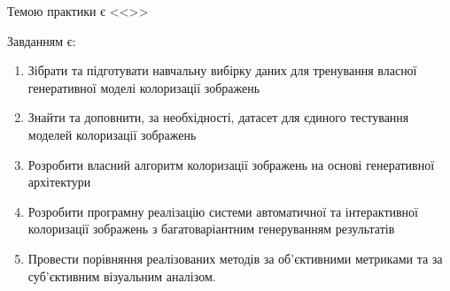 Темою практики є <<\reportTitle>>

Завданням є:
\begin{enumerate}
    \item Зібрати та підготувати навчальну вибірку даних для тренування власної генеративної моделі колоризації зображень
    \item Знайти та доповнити, за необхідності, датасет для єдиного тестування моделей колоризації зображень
    \item Розробити власний алгоритм колоризації зображень на основі генеративної архітектури
    \item Розробити програмну реалізацію системи автоматичної та інтерактивної колоризації зображень з багатоваріантним генеруванням результатів
    \item Провести порівняння реалізованих методів за об'єктивними метриками та за суб'єктивним візуальним аналізом. 
\end{enumerate}
